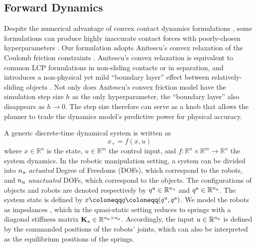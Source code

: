 \subsection{Forward Dynamics} \label{sec:convex_quasi_dynamic_contact_dynamics}
Despite the numerical advantage of convex contact dynamics formulations \cite{anitescu2006optimization, todorov2012mujoco, castro2021unconstrained}, some formulations can produce highly inaccurate contact forces with poorly-chosen hyperparameters \cite{kolbert2016experimental}. Our formulation adopts Anitescu's convex relaxation of the Coulomb friction constraints \cite{anitescu2006optimization}. Anitescu's convex relaxation is equivalent to common LCP formulations \cite{stewart2000rigid} in non-sliding contacts or in separation, and introduces a non-physical yet mild ``boundary layer'' effect between relatively-sliding objects \cite{pang2021convex, castro2021unconstrained}. Not only does Anitescu's convex friction model have the simulation step size $h$ as the only hyperparameter, the ``boundary layer'' also disappears as $h \rightarrow 0$. The step size therefore can serve as a knob that allows the planner to trade the dynamics model's predictive power for physical accuracy.

A generic discrete-time dynamical system is written as
\begin{equation}
\label{eq:f_x_u}
x_+ = f(x, u) 
\end{equation}
where $x \in \mathbb{R}^n$ is the state, $u \in \mathbb{R}^m$ the control input, and $f: \mathbb{R}^n\times\mathbb{R}^m\rightarrow\mathbb{R}^n$ the system dynamics. 
In the robotic manipulation setting, a system can be divided into $\nA$ \emph{actuated} Degree of Freedoms (DOFs), which correspond to the robots, and $\nU$ \emph{unactuated} DOFs, which correspond to the objects. The configurations of objects and robots are denoted respectively by $\qu \in \R[\nU]$ and $\qa \in \R[\nA]$. The system state is defined by $x \coloneqq q \coloneqq (\qu, \qa)$. We model the robots as impedances \cite{hogan1985impedance}, which in the quasi-static setting reduces to springs with a diagonal stiffness matrix $\Ka \in \R[\nA \times \nA]$. Accordingly, the input $u \in \R[\nA]$ is defined by the commanded positions of the robots' joints, which can also be interpreted as the equilibrium positions of the springs.

